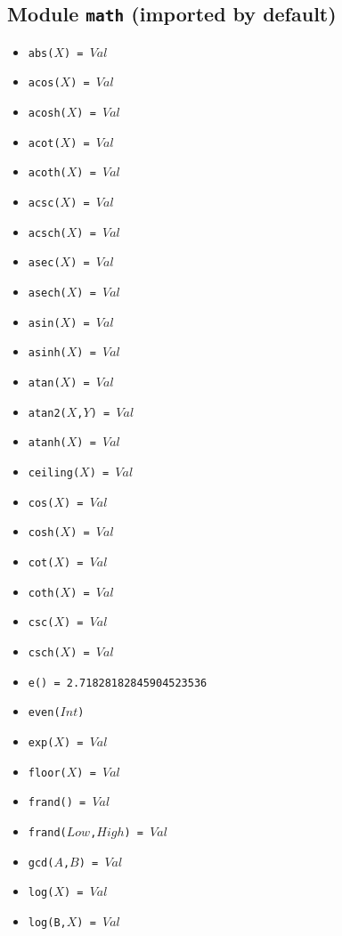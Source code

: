 \documentclass[10pt]{article}
\begin{document}
\begin{multicols}{2}
\section*{Module \texttt{math} (imported by default)}
\begin{scriptsize}
\begin{itemize}
   \item \texttt{abs($X$) = $Val$} 
   \item \texttt{acos($X$) = $Val$}
   \item \texttt{acosh($X$) = $Val$} 
   \item \texttt{acot($X$) = $Val$}
   \item \texttt{acoth($X$) = $Val$} 
   \item \texttt{acsc($X$) = $Val$} 
   \item \texttt{acsch($X$) = $Val$} 
   \item \texttt{asec($X$) = $Val$}
   \item \texttt{asech($X$) = $Val$} 
   \item \texttt{asin($X$) = $Val$}
   \item \texttt{asinh($X$) = $Val$} 
   \item \texttt{atan($X$) = $Val$}
   \item \texttt{atan2($X$,$Y$) = $Val$}
   \item \texttt{atanh($X$) = $Val$} 
   \item \texttt{ceiling($X$) = $Val$} 
   \item \texttt{cos($X$) = $Val$} 
   \item \texttt{cosh($X$)  = $Val$} 
   \item \texttt{cot($X$) = $Val$}
   \item \texttt{coth($X$)  = $Val$} 
   \item \texttt{csc($X$) = $Val$}
   \item \texttt{csch($X$)  = $Val$} 
   \item \texttt{e() = 2.71828182845904523536} 
   \item \texttt{even($Int$)} 
   \item \texttt{exp($X$) = $Val$} 
   \item \texttt{floor($X$) = $Val$} 
   \item \texttt{frand() = $Val$}
   \item \texttt{frand($Low$,$High$) = $Val$}    
   \item \texttt{gcd($A$,$B$) = $Val$} 
   \item \texttt{log($X$) = $Val$}
   \item \texttt{log(B,$X$) = $Val$} 

\end{itemize}
\end{scriptsize}
\end{multicols}
\end{document}
